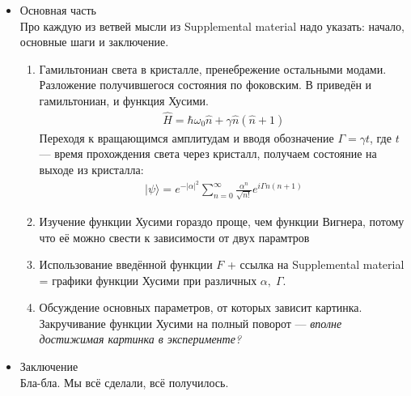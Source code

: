 \documentclass[a4paper, 12pt]{article}
\newenvironment{eqw}{\begin{equation} \begin{aligned}}   
    {\end{aligned}    \end{equation}}
\begin{document}
\begin{itemize}
    \item Основная часть\\
    Про каждую из ветвей мысли из Supplemental material надо указать: начало, основные шаги и заключение.
    \begin{enumerate}
        \item Гамильтониан света в кристалле, пренебрежение остальными модами. Разложение получившегося состояния по фоковским. В \cite{milburn1986quantum} приведён и гамильтониан, и функция Хусими.
        \begin{eqw}
            \hat H = \hbar \omega_0 \hat n + \gamma \hat n(\hat n + 1)
        \end{eqw}
        Переходя к вращающимся амплитудам и вводя обозначение $\Gamma = \gamma t$, где $t$ --- время прохождения света через кристалл, получаем состояние на выходе из кристалла:
        \begin{eqw}
            |\psi\rangle = e^{-|\alpha|^2}\sum\limits_{n=0}^{\infty}\frac{\alpha^n}{\sqrt{n!}}e^{i\Gamma n(n+1)}
        \end{eqw}
        \item Изучение функции Хусими гораздо проще, чем функции Вигнера, потому что её можно свести к зависимости от двух парамтров
        \item Использование введённой функции $F$ + ссылка на Supplemental material = графики функции Хусими при различных $\alpha, \; \Gamma$.
        \item Обсуждение основных параметров, от которых зависит картинка. Закручивание функции Хусими на полный поворот --- \textit{вполне достижимая картинка в эксперименте?}
    \end{enumerate}
    \item Заключение\\
    Бла-бла. Мы всё сделали, всё получилось.
\end{itemize}

\nocite{*}

\end{document}

